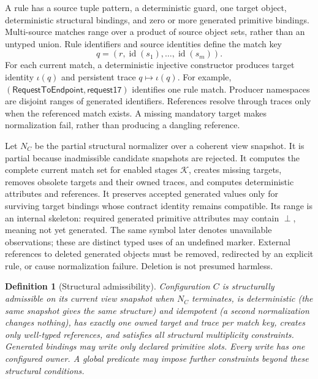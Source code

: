 \documentclass[pdflatex,sn-mathphys-num]{sn-jnl}
\theoremstyle{thmstyleone}
\theoremstyle{thmstylethree}
\newtheorem{definition}{Definition}
\theoremstyle{thmstyletwo}
\newcommand{\Keys}{\mathcal K}
\newcommand{\botv}{\perp}
\begin{document}
A rule has a source tuple pattern, a deterministic guard, one target object, deterministic structural bindings, and zero or more generated primitive bindings. Multi-source matches range over a product of source object sets, rather than an untyped union. Rule identifiers and source identities define the match key
\begin{equation}
q=(r,\operatorname{id}(s_1),\ldots,\operatorname{id}(s_m)).
\end{equation}
For each current match, a deterministic injective constructor produces target identity $\iota(q)$ and persistent trace $q\mapsto\iota(q)$. For example, $(\mathsf{RequestToEndpoint},\mathsf{request17})$ identifies one rule match. Producer namespaces are disjoint ranges of generated identifiers. References resolve through traces only when the referenced match exists. A missing mandatory target makes normalization fail, rather than producing a dangling reference.

Let $N_C$ be the partial structural normalizer over a coherent view snapshot. It is partial because inadmissible candidate snapshots are rejected. It computes the complete current match set for enabled stages $\Keys$, creates missing targets, removes obsolete targets and their owned traces, and computes deterministic attributes and references. It preserves accepted generated values only for surviving target bindings whose contract identity remains compatible. Its range is an internal skeleton: required generated primitive attributes may contain $\botv$, meaning not yet generated. The same symbol later denotes unavailable observations; these are distinct typed uses of an undefined marker. External references to deleted generated objects must be removed, redirected by an explicit rule, or cause normalization failure. Deletion is not presumed harmless.

\begin{definition}[Structural admissibility]\label{def:struct}
Configuration $C$ is structurally admissible on its current view snapshot when $N_C$ terminates, is deterministic (the same snapshot gives the same structure) and idempotent (a second normalization changes nothing), has exactly one owned target and trace per match key, creates only well-typed references, and satisfies all structural multiplicity constraints. Generated bindings may write only declared primitive slots. Every write has one configured owner. A global predicate may impose further constraints beyond these structural conditions.
\end{definition}
\end{document}
